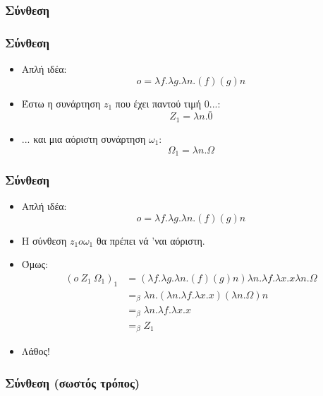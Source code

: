 \documentclass{beamer}
\begin{document}
\subsubsection{Σύνθεση}
\begin{frame}
        \frametitle{Σύνθεση}
        \begin{itemize}
                \item Απλή ιδέα: $$o = \lambda f. \lambda g. \lambda n . (f) (g) n$$
                \pause
                \item Έστω η συνάρτηση $z_1$ που έχει παντού τιμή 0...:
                    $$Z_1 = \lambda n. \bar{0}$$
                \pause
                \item ... και μια αόριστη συνάρτηση $\omega_1$:
                	$$\Omega_1 = \lambda n. \Omega$$
        \end{itemize}
\end{frame}
\begin{frame}
        \frametitle{Σύνθεση}
        \begin{itemize}
                \item Απλή ιδέα: $$o = \lambda f. \lambda g. \lambda n . (f) (g) n$$
        		\item Η σύνθεση $z_1 o \omega_1$ θα πρέπει νά 'ναι αόριστη.
            	\pause
        		\item Όμως:
        		$$\begin{array}{ll}
        		  (o\:Z_1\:\Omega_1)_1 &= (\lambda f. \lambda g. \lambda n . (f) (g) n) \lambda n. \lambda f. \lambda x . x \lambda n. \Omega \\
        		                       &=_\beta \lambda n . (\lambda n. \lambda f. \lambda x . x) (\lambda n. \Omega) n \\
        		                       &=_\beta \lambda n . \lambda f. \lambda x . x \\
        		                       &=_\beta Z_1
        		\end{array}$$
            	\pause
        		\item Λάθος!
        \end{itemize}
\end{frame}

\subsubsection{Σύνθεση (σωστός τρόπος)}
\end{document}
